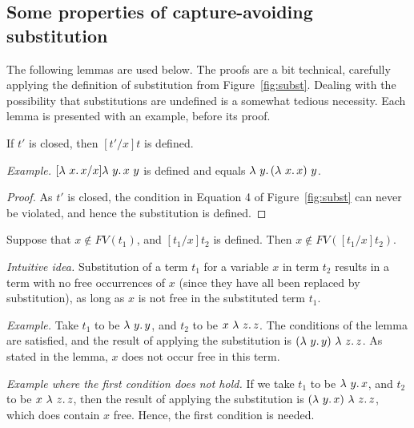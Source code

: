 \subsection{Some properties of capture-avoiding substitution}

The following lemmas are used below.  The proofs are a bit technical, carefully applying
the definition of substitution from Figure~\ref{fig:subst}.  Dealing with the possibility
that substitutions are undefined is a somewhat tedious necessity.  Each lemma is presented
with an example, before its proof.

\begin{lemma}
  If $t'$ is closed, then $[t'/x]t$ is defined.
\end{lemma}
\noindent\textit{Example.} $[\lam{x}{x}/x]\lam{y}{x\ y}$ is defined and equals
$\lambda\ y.\, (\lambda\ x.\, x)\ y$.

\begin{proof}
  As $t'$ is closed, the condition in Equation 4 of Figure~\ref{fig:subst} can never
  be violated, and hence the substitution is defined.
\end{proof}

\begin{lemma}
\label{lem:substvargone}
  Suppose that $x\not\in\textit{FV}(t_1)$, and $[t_1/x]t_2$ is defined.  Then
  $x\not\in\textit{FV}([t_1/x]t_2)$.
\end{lemma}

\noindent\textit{Intuitive idea.} Substitution of a term $t_1$ for a variable $x$ in term $t_2$ results in a term
with no free occurrences of
$x$ (since they have all been replaced by substitution), as long as $x$ is not free in the substituted term $t_1$.

\vspace{.2cm}

\noindent\textit{Example.} Take $t_1$ to be $\lambda\ y.\, y$, and $t_2$ to be $x\ \lambda\ z.\, z$.
The conditions of the lemma are satisfied, and the result of applying the substitution
is $(\lambda\ y.\, y)\ \lambda\ z.\, z$.  As stated in the lemma, $x$ does not occur free in this term.

\vspace{.2cm}

\noindent\textit{Example where the first condition does not hold.} If
we take $t_1$ to be $\lambda\ y.\, x$, and $t_2$ to be $x\ \lambda\ z.\, z$,
then the result of applying the substitution is
$(\lam{y}{x})\ \lam{z}{z}$, which does contain $x$ free.  Hence, the first condition is needed.


